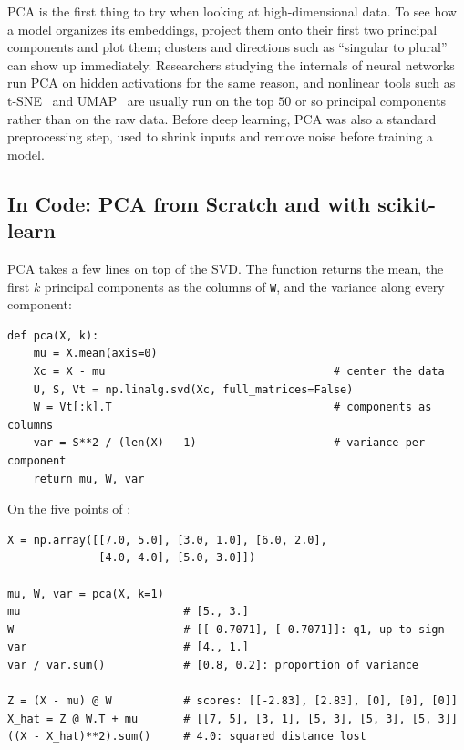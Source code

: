\begin{aibox}
  PCA is the first thing to try when looking at high-dimensional data. To
  see how a model organizes its embeddings, project them onto their first
  two principal components and plot them; clusters and directions such as
  ``singular to plural'' can show up immediately. Researchers studying
  the internals of neural networks run PCA on hidden activations for the
  same reason, and nonlinear tools such as
  t-SNE~\cite{vandermaaten2008tsne} and UMAP~\cite{mcinnes2018umap} are
  usually run
  on the top $50$ or so principal components rather than on the raw
  data. Before deep learning, PCA was also a standard preprocessing step,
  used to shrink inputs and remove noise before training a model.
\end{aibox}

\subsection{In Code: PCA from Scratch and with scikit-learn}
\label{sec:ch04-pca-code}

PCA takes a few lines on top of the SVD. The function returns the mean,
the first $k$ principal components as the columns of \texttt{W}, and the
variance along every component:

\begin{lstlisting}
def pca(X, k):
    mu = X.mean(axis=0)
    Xc = X - mu                                   # center the data
    U, S, Vt = np.linalg.svd(Xc, full_matrices=False)
    W = Vt[:k].T                                  # components as columns
    var = S**2 / (len(X) - 1)                     # variance per component
    return mu, W, var
\end{lstlisting}

On the five points of :

\begin{lstlisting}
X = np.array([[7.0, 5.0], [3.0, 1.0], [6.0, 2.0],
              [4.0, 4.0], [5.0, 3.0]])

mu, W, var = pca(X, k=1)
mu                         # [5., 3.]
W                          # [[-0.7071], [-0.7071]]: q1, up to sign
var                        # [4., 1.]
var / var.sum()            # [0.8, 0.2]: proportion of variance

Z = (X - mu) @ W           # scores: [[-2.83], [2.83], [0], [0], [0]]
X_hat = Z @ W.T + mu       # [[7, 5], [3, 1], [5, 3], [5, 3], [5, 3]]
((X - X_hat)**2).sum()     # 4.0: squared distance lost
\end{lstlisting}

